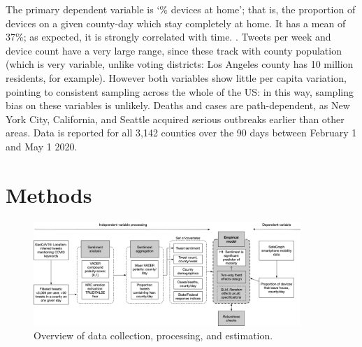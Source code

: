 \documentclass{article}
\begin{document}
The primary dependent variable is `\% devices at home'; that is, the proportion of devices on a given county-day which stay completely at home. It has a mean of 37\%; as expected, it is strongly correlated with time. . Tweets per week and device count have a very large range, since these track with county population (which is very variable, unlike voting districts: Los Angeles county has 10 million residents, for example). However both variables show little per capita variation, pointing to consistent sampling across the whole of the US: in this way, sampling bias on these variables is unlikely. Deaths and cases are path-dependent, as New York City, California, and Seattle acquired serious outbreaks earlier than other areas. Data is reported for all 3,142 counties over the 90 days between February 1 and May 1 2020. 

\section{Methods}\label{methods}
\begin{figure}[!htb]
  \centering
  \caption{Overview of data collection, processing, and estimation.}\label{process}
  \includegraphics[width=0.9\textwidth]{figs/processing.png}
\end{figure}
\end{document}
